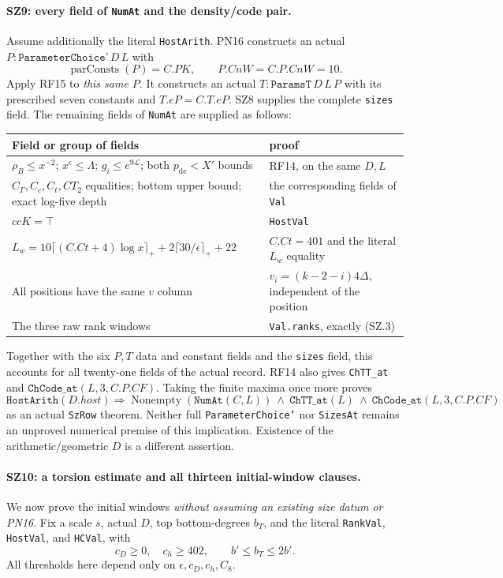 \paragraph{SZ9: every field of \texttt{NumAt} and the density/code pair.}
Assume additionally the literal \texttt{HostArith}. PN16 constructs
an actual $P:\texttt{ParameterChoice'}\,D\,L$ with
\[
          \operatorname{parConsts}(P)=C.PK,
                       \qquad P.CnW=C.P.CnW=10.
\]
Apply RF15 to \emph{this same $P$}. It constructs an actual
$T:\texttt{ParamsT}\,D\,L\,P$ with its prescribed seven constants
and $T.eP=C.T.eP$. SZ8 supplies the complete \texttt{sizes} field.
The remaining fields of \texttt{NumAt} are supplied as follows:
\begin{center}\small
\begin{tabular}{p{}p{}}
Field or group of fields & proof\\\hline
$\rho_B\leq x^{-2}$; $x^\epsilon\leq\Lambda$;
$g_i\leq e^{9\mathcal L}$; both $p_{\mathrm{de}}<X'$ bounds
 & RF14, on the same $D,L$\\
$C_\Gamma,C_c,C_t,CT_2$ equalities; bottom upper bound;
exact log-five depth & the corresponding fields of \texttt{Val}\\
$ccK=\top$ & \texttt{HostVal}\\
$L_w=10\lceil(C.Ct+4)\log x\rceil_+
                 +2\lceil30/\epsilon\rceil_++22$
 & $C.Ct=401$ and the literal $L_w$ equality\\
All positions have the same $v$ column
 & $v_i=(k-2-i)4\Delta$, independent of the position\\
The three raw rank windows & \texttt{Val.ranks}, exactly (SZ.3)
\end{tabular}
\end{center}
Together with the six $P,T$ data and constant fields and the
\texttt{sizes} field, this accounts for all twenty-one fields of
the actual record. RF14 also gives \texttt{ChTT\_at} and
$\texttt{ChCode\_at}(L,3,C.P.CF)$. Taking the finite maxima once
more proves
\[
 \texttt{HostArith}(D.host)\Longrightarrow
 \operatorname{Nonempty}(\texttt{NumAt}(C,L))
 \ \land\ \texttt{ChTT\_at}(L)
 \ \land\ \texttt{ChCode\_at}(L,3,C.P.CF)                    \tag{SZ.16}
\]
as an actual \texttt{SzRow} theorem. Neither full
\texttt{ParameterChoice'} nor \texttt{SizesAt} remains an
unproved numerical premise of this implication. Existence of the
arithmetic/geometric $D$ is a different assertion.

\paragraph{SZ10: a torsion estimate and all thirteen initial-window clauses.}
We now prove the initial windows \emph{without assuming an existing
size datum or PN16}. Fix a scale $s$, actual $D$, top bottom-degrees
$b_T$, and the literal \texttt{RankVal}, \texttt{HostVal}, and
\texttt{HCVal}, with
\[
 c_D\geq0,\quad c_h\geq402,\qquad
                  b'\leq b_T\leq2b'.                         \tag{SZ.17}
\]
All thresholds here depend only on $\epsilon,c_D,c_h,C_8$.

